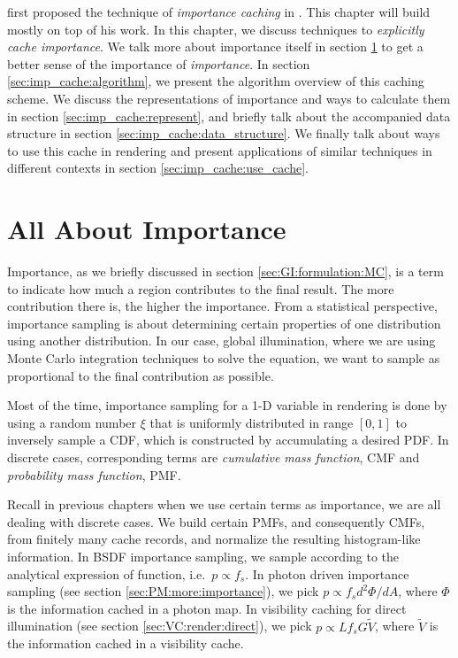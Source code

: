 \documentclass[]{book}
\begin{document}
\citeauthor{georgiev2012importance} first proposed the technique of \textit{importance caching} in \citeyear{georgiev2012importance} \cite{georgiev2012importance}.
This chapter will build mostly on top of his work.
In this chapter, we discuss techniques to \textit{explicitly cache importance}.
We talk more about importance itself in section \ref{sec:imp_cache:importance} to get a better sense of the importance of \textit{importance}.
In section \ref{sec:imp_cache:algorithm}, we present the algorithm overview of this caching scheme.
We discuss the representations of importance and ways to calculate them in section \ref{sec:imp_cache:represent}, and briefly talk about the accompanied data structure in section \ref{sec:imp_cache:data_structure}.
We finally talk about ways to use this cache in rendering and present applications of similar techniques in different contexts in section \ref{sec:imp_cache:use_cache}.

\section{All About Importance}
\label{sec:imp_cache:importance}
Importance, as we briefly discussed in section \ref{sec:GI:formulation:MC}, is a term to indicate how much a region contributes to the final result.
The more contribution there is, the higher the importance.
From a statistical perspective, importance sampling is about determining certain properties of one distribution using another distribution.
In our case, global illumination, where we are using Monte Carlo integration techniques to solve the equation, we want to sample as proportional to the final contribution as possible.

Most of the time, importance sampling for a 1-D variable in rendering is done by using a random number $\xi$ that is uniformly distributed in range $[0,1]$ to inversely sample a CDF, which is constructed by accumulating a desired PDF.
In discrete cases, corresponding terms are \textit{cumulative mass function}, CMF and \textit{probability mass function}, PMF.

Recall in previous chapters when we use certain terms as importance, we are all dealing with discrete cases.
We build certain PMFs, and consequently CMFs, from finitely many cache records, and normalize the resulting histogram-like information.
In BSDF importance sampling, we sample according to the analytical expression of function, i.e.\ $p \propto f_s$.
In photon driven importance sampling (see section \ref{sec:PM:more:importance}), we pick $p \propto f_s d^2 \Phi / dA$, where $\Phi$ is the information cached in a photon map.
In visibility caching for direct illumination (see section \ref{sec:VC:render:direct}), we pick $p \propto L f_s G \widetilde{V}$, where $\widetilde{V}$ is the information cached in a visibility cache.
\end{document}
